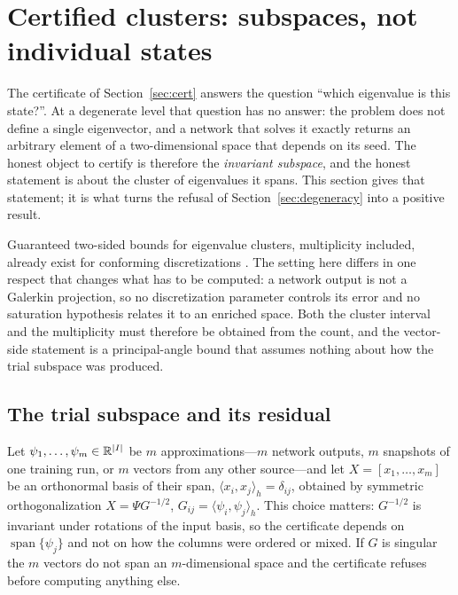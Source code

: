 \section{Certified clusters: subspaces, not individual states}
\label{sec:subspace}

The certificate of Section~\ref{sec:cert} answers the question ``which
eigenvalue is this state?''. At a degenerate level that question has no
answer: the problem does not define a single eigenvector, and a network that
solves it exactly returns an arbitrary element of a two-dimensional space
that depends on its seed. The honest object to certify is therefore the
\emph{invariant subspace}, and the honest statement is about the cluster of
eigenvalues it spans. This section gives that statement; it is what turns the
refusal of Section~\ref{sec:degeneracy} into a positive result.

Guaranteed two-sided bounds for eigenvalue clusters, multiplicity included,
already exist for conforming discretizations \citep{cances2020}. The setting
here differs in one respect that changes what has to be computed: a network
output is not a Galerkin projection, so no discretization parameter controls
its error and no saturation hypothesis relates it to an enriched space. Both
the cluster interval and the multiplicity must therefore be obtained from the
count, and the vector-side statement is a principal-angle bound that assumes
nothing about how the trial subspace was produced.

\subsection{The trial subspace and its residual}
\label{sec:sub}

Let $\psi_1,\dots,\psi_m\in\mathbb{R}^{|I|}$ be $m$ approximations---$m$ network
outputs, $m$ snapshots of one training run, or $m$ vectors from any other
source---and let $X=[x_1,\dots,x_m]$ be an orthonormal basis of their span,
$\langle x_i,x_j\rangle_h=\delta_{ij}$, obtained by symmetric
orthogonalization $X=\Psi G^{-1/2}$, $G_{ij}=\langle\psi_i,\psi_j\rangle_h$.
This choice matters: $G^{-1/2}$ is invariant under rotations of the input
basis, so the certificate depends on $\operatorname{span}\{\psi_j\}$ and not
on how the columns were ordered or mixed. If $G$ is singular the $m$ vectors
do not span an $m$-dimensional space and the certificate refuses before
computing anything else.


